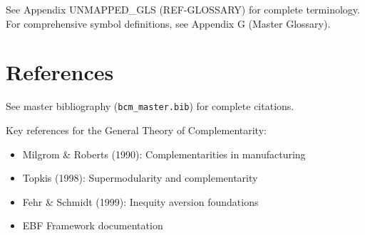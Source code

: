 See Appendix UNMAPPED_GLS (REF-GLOSSARY) for complete terminology.
For comprehensive symbol definitions, see Appendix G (Master Glossary).


\section{References}
\label{sec:gtc-references}

\nocite{bcm_master}
See master bibliography (\texttt{bcm\_master.bib}) for complete citations.

Key references for the General Theory of Complementarity:
\begin{itemize}[nosep]
    \item Milgrom \& Roberts (1990): Complementarities in manufacturing
    \item Topkis (1998): Supermodularity and complementarity
    \item Fehr \& Schmidt (1999): Inequity aversion foundations
    \item EBF Framework documentation
\end{itemize}


